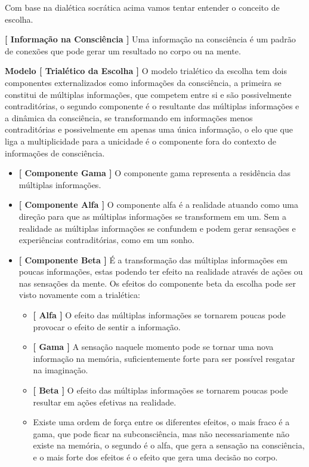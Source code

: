 \documentclass[10pt,a4paper]{report}
\begin{document}
Com base na dialética socrática acima vamos tentar entender o conceito de escolha.

\hspace{\baselineskip}

\textbf{[ Informação na Consciência ]} Uma informação na consciência é um padrão de conexões que pode gerar um resultado no corpo ou na mente.

\hspace{\baselineskip}

\textbf{Modelo [ Trialético da Escolha ]} O modelo trialético da escolha tem dois componentes externalizados como informações da consciência, a primeira se constitui de múltiplas informações, que competem entre si e são possivelmente contraditórias, o segundo componente é o resultante das múltiplas informações e a dinâmica da consciência, se transformando em informações menos contraditórias e possivelmente em apenas uma única informação, o elo que que liga a multiplicidade para a unicidade é o componente fora do contexto de informações de consciência. 

\begin{itemize}
	\item[ (i) ] \textbf{[ Componente Gama ]} O componente gama representa a residência das múltiplas informações.
	\item[ (ii) ] \textbf{[ Componente Alfa ]} O componente alfa é a realidade atuando como uma direção para que as múltiplas informações se transformem em um. Sem a realidade as múltiplas informações se confundem e podem gerar sensações e experiências contraditórias, como em um sonho.
	\item[ (iii) ] \textbf{[ Componente Beta ]} É a transformação das múltiplas informações em poucas informações, estas podendo ter efeito na realidade através de ações ou nas sensações da mente. Os efeitos do componente beta da escolha pode ser visto novamente com a trialética:
	\begin{itemize}
		\item[ (i) ] \textbf{[ Alfa ]} O efeito das múltiplas informações se tornarem poucas pode provocar o efeito de sentir a informação.
		\item[ (ii) ] \textbf{[ Gama ]} A sensação naquele momento pode se tornar uma nova informação na memória, suficientemente forte para ser possível resgatar na imaginação.
		\item[ (iii) ] \textbf{[ Beta ]} O efeito das múltiplas informações se tornarem poucas pode resultar em ações efetivas na realidade.
		\item[ ] Existe uma ordem de força entre os diferentes efeitos, o mais fraco é a gama, que pode ficar na subconsciência, mas não necessariamente não existe na memória, o segundo é o alfa, que gera a sensação na consciência, e o mais forte dos efeitos é o efeito que gera uma decisão no corpo.
	\end{itemize}
\end{itemize}
\end{document}
